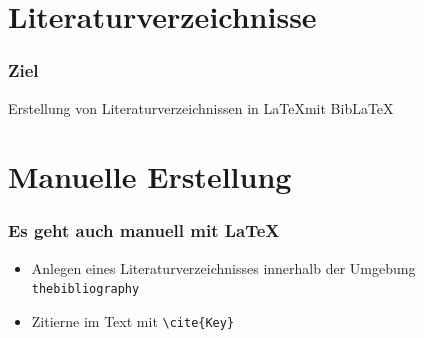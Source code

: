 \section{Literaturverzeichnisse}

\begin{frame}
  \frametitle{Ziel}

  \begin{center}
  Erstellung von Literaturverzeichnissen in \LaTeX mit Bib\LaTeX
  \end{center}

\end{frame}

\section{Manuelle Erstellung}

\begin{frame}[fragile]
  \frametitle{Es geht auch manuell mit \LaTeX}

  \begin{itemize}
    \item<+-> Anlegen eines Literaturverzeichnisses innerhalb der Umgebung \lstinline!thebibliography!
    \item<+-> Zitierne im Text mit \lstinline!\cite{Key}!
  \end{itemize}
\end{frame}

